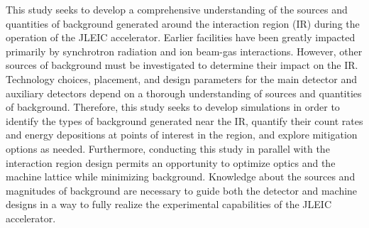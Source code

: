 This study seeks to develop a comprehensive understanding of the sources and quantities of background generated around the interaction region (IR) during the operation of the JLEIC accelerator. Earlier facilities have been greatly impacted primarily by synchrotron radiation and ion beam-gas interactions.  However, other sources of background must be investigated to determine their impact on the IR.  Technology choices, placement, and design parameters for the main detector and auxiliary detectors depend on a thorough understanding of sources and quantities of background.  Therefore, this study seeks to develop simulations in order to identify the types of background generated near the IR, quantify their count rates and energy depositions at points of interest in the region, and explore mitigation options as needed.  Furthermore, conducting this study in parallel with the interaction region design permits an opportunity to optimize optics and the machine lattice while minimizing background. Knowledge about the sources and magnitudes of background are necessary to guide both the detector and machine designs in a way to fully realize the experimental capabilities of the JLEIC accelerator. 